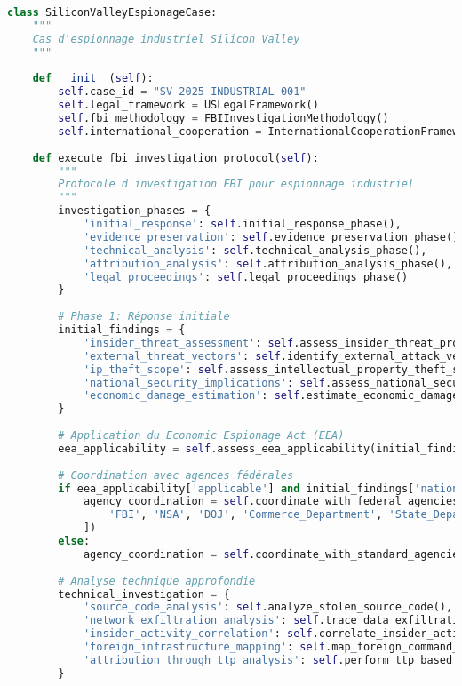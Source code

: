 \begin{lstlisting}[language=Python, caption=Investigation selon méthodologie FBI avec framework CRO]
class SiliconValleyEspionageCase:
    """
    Cas d'espionnage industriel Silicon Valley
    """
    
    def __init__(self):
        self.case_id = "SV-2025-INDUSTRIAL-001"
        self.legal_framework = USLegalFramework()
        self.fbi_methodology = FBIInvestigationMethodology()
        self.international_cooperation = InternationalCooperationFramework()
        
    def execute_fbi_investigation_protocol(self):
        """
        Protocole d'investigation FBI pour espionnage industriel
        """
        investigation_phases = {
            'initial_response': self.initial_response_phase(),
            'evidence_preservation': self.evidence_preservation_phase(),
            'technical_analysis': self.technical_analysis_phase(),
            'attribution_analysis': self.attribution_analysis_phase(),
            'legal_proceedings': self.legal_proceedings_phase()
        }
        
        # Phase 1: Réponse initiale
        initial_findings = {
            'insider_threat_assessment': self.assess_insider_threat_probability(),
            'external_threat_vectors': self.identify_external_attack_vectors(),
            'ip_theft_scope': self.assess_intellectual_property_theft_scope(),
            'national_security_implications': self.assess_national_security_impact(),
            'economic_damage_estimation': self.estimate_economic_damage()
        }
        
        # Application du Economic Espionage Act (EEA)
        eea_applicability = self.assess_eea_applicability(initial_findings)
        
        # Coordination avec agences fédérales
        if eea_applicability['applicable'] and initial_findings['national_security_implications'] > 0.7:
            agency_coordination = self.coordinate_with_federal_agencies([
                'FBI', 'NSA', 'DOJ', 'Commerce_Department', 'State_Department'
            ])
        else:
            agency_coordination = self.coordinate_with_standard_agencies(['FBI', 'DOJ'])
            
        # Analyse technique approfondie
        technical_investigation = {
            'source_code_analysis': self.analyze_stolen_source_code(),
            'network_exfiltration_analysis': self.trace_data_exfiltration_paths(),
            'insider_activity_correlation': self.correlate_insider_activities(),
            'foreign_infrastructure_mapping': self.map_foreign_command_infrastructure(),
            'attribution_through_ttp_analysis': self.perform_ttp_based_attribution()
        }
        

\end{lstlisting}
